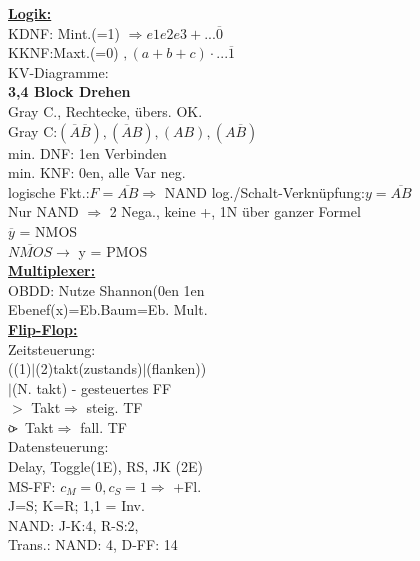 \documentclass[8pt]{extarticle}
\begin{document}
\begin{minipage}{0.33\textwidth}


\underline{\textbf{Logik:}}\\
KDNF: Mint.(=1) $\Rightarrow e1e2e3 + ...\overline{0}$\\
KKNF:Maxt.(=0) $, (a+b+c) \cdot ...\overline{1}$\\
KV-Diagramme:\\ 
\textbf{3,4 Block Drehen}\\
Gray C., Rechtecke, übers. OK.\\
Gray C:$(\overline{A} \overline{B}), (\overline{A}B), (AB), (A\overline{B})$\\
min. DNF: 1en Verbinden\\
min. KNF: 0en, alle Var neg.\\
logische Fkt.:$F = \overline{AB} \Rightarrow $ NAND
log./Schalt-Verknüpfung:$y = \overline{AB} $\\
Nur NAND $\Rightarrow$ 2 Nega., keine +, 1N über ganzer Formel\\
$\overline{y}$ = NMOS\\
$\overline{NMOS} \rightarrow$ y = PMOS\\


\underline{\textbf{Multiplexer:}}\\
OBDD: Nutze Shannon(0en 1en\\
Ebenef(x)=Eb.Baum=Eb. Mult.\\

\underline{\textbf{Flip-Flop:}}\\
Zeitsteuerung:\\ ((1)$|$(2)takt(zustands)$|$(flanken))\\$|$(N. takt) - gesteuertes FF\\
$>$ Takt$\Rightarrow$ steig. TF\\
$\rlap{o}{>}$ Takt$\Rightarrow$ fall. TF\\
Datensteuerung:\\ Delay, Toggle(1E), RS, JK (2E)\\
MS-FF: $c_M=0,c_S=1 \Rightarrow$ +Fl.\\
J=S; K=R; 1,1 = Inv.\\
NAND: J-K:4, R-S:2,\\
Trans.: NAND: 4, D-FF: 14\\

\end{minipage}
~~~~~~~
\end{document}

